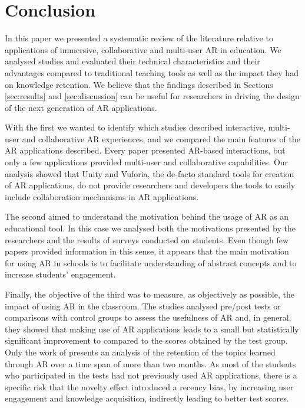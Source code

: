 \section{Conclusion} \label{sec:conclusion}
In this paper we presented a systematic review of the literature relative to applications of immersive, collaborative and multi-user \gls{AR} in education. We analysed \papersSelected studies and evaluated their technical characteristics and their advantages compared to traditional teaching tools as well as the impact they had on knowledge retention. We believe that the findings described in Sections \ref{sec:results} and \ref{sec:discussion} can be useful for researchers in driving the design of the next generation of AR applications.

With the first  we wanted to identify which studies described interactive, multi-user and collaborative AR experiences, and we compared the main features of the AR applications described. Every paper presented AR-based interactions, but only a few applications provided multi-user and collaborative capabilities. Our analysis showed that Unity and Vuforia, the de-facto standard tools for creation of \gls{AR} applications, do not provide researchers and developers the tools to easily include collaboration mechanisms in \gls{AR} applications.

The second  aimed to understand the motivation behind the usage of \gls{AR} as an educational tool. In this case we analysed both the motivations presented by the researchers and the results of surveys conducted on students. Even though few papers provided information in this sense, it appears that the main motivation for using \gls{AR} in schools is to facilitate understanding of abstract concepts and to increase students' engagement.

Finally, the objective of the third  was to measure, as objectively as possible, the impact of using \gls{AR} in the classroom. The studies analysed pre/post tests or comparisons with control groups to assess the usefulness of \gls{AR} and, in general, they showed that making use of \gls{AR} applications leads to a small but statistically significant improvement to compared to the scores obtained by the test group. Only the work of \citet{lin2016effect} presents an analysis of the retention of the topics learned through \gls{AR} over a time span of more than two months. As most of the students who participated in the tests had not previously used \gls{AR} applications, there is a specific risk that the novelty effect introduced a recency bias, by increasing user engagement and knowledge acquisition, indirectly leading to better test scores.  

